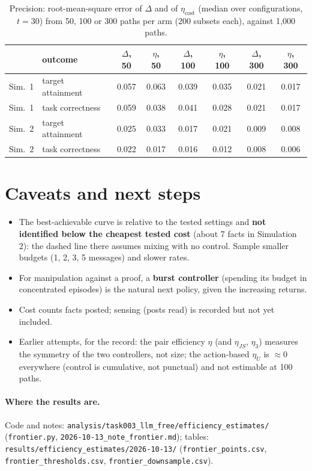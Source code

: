 \documentclass[10pt,a4paper]{article}
\begin{document}
\begin{table}[H]
\centering\small
\caption{Precision: root-mean-square error of $\Delta$ and of $\eta_{\text{cost}}$ (median over configurations,
$t = 30$) from 50, 100 or 300 paths per arm (200 subsets each), against 1{,}000 paths.}
\begin{tabular}{llcccccc}
\toprule
 & outcome & $\Delta$, 50 & $\eta$, 50 & $\Delta$, 100 & $\eta$, 100 & $\Delta$, 300 & $\eta$, 300 \\
\midrule
Sim.~1 & target attainment & 0.057 & 0.063 & 0.039 & 0.035 & 0.021 & 0.017 \\
Sim.~1 & task correctness & 0.059 & 0.038 & 0.041 & 0.028 & 0.021 & 0.017 \\
Sim.~2 & target attainment & 0.025 & 0.033 & 0.017 & 0.021 & 0.009 & 0.008 \\
Sim.~2 & task correctness & 0.022 & 0.017 & 0.016 & 0.012 & 0.008 & 0.006 \\
\bottomrule
\end{tabular}
\end{table}

\section{Caveats and next steps}

\begin{itemize}\itemsep1pt
\item The best-achievable curve is relative to the tested settings and \textbf{not identified below the
  cheapest tested cost} (about 7 facts in Simulation 2): the dashed line there assumes mixing with no control. Sample
  smaller budgets (1, 2, 3, 5 messages) and slower rates.
\item For manipulation against a proof, a \textbf{burst controller} (spending its budget in concentrated
  episodes) is the natural next policy, given the increasing returns.
\item Cost counts facts posted; sensing (posts read) is recorded but not yet included.
\item Earlier attempts, for the record: the pair efficiency $\eta$ (and $\eta_{JS}$, $\eta_3$) measures the
  symmetry of the two controllers, not size; the action-based $\eta_U$ is $\approx 0$ everywhere (control is
  cumulative, not punctual) and not estimable at 100 paths.
\end{itemize}

\paragraph{Where the results are.} Code and notes:
\texttt{analysis/task003\_llm\_free/efficiency\_estimates/} (\texttt{frontier.py},
\texttt{2026-10-13\_note\_frontier.md}); tables: \texttt{results/efficiency\_estimates/2026-10-13/}
(\texttt{frontier\_points.csv}, \texttt{frontier\_thresholds.csv}, \texttt{frontier\_downsample.csv}).
\end{document}
